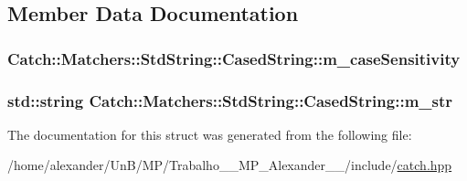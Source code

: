\subsection{Member Data Documentation}
\hypertarget{structCatch_1_1Matchers_1_1StdString_1_1CasedString_ae1c2864c986941536a6e94cca0528f92}{
\subsubsection[{m\-\_\-case\-Sensitivity}]{ Catch\-::\-Matchers\-::\-Std\-String\-::\-Cased\-String\-::m\-\_\-case\-Sensitivity}}\label{structCatch_1_1Matchers_1_1StdString_1_1CasedString_ae1c2864c986941536a6e94cca0528f92}
\hypertarget{structCatch_1_1Matchers_1_1StdString_1_1CasedString_ad05dbc99aba3c3c386d6b856b213f911}{
\subsubsection[{m\-\_\-str}]{\setlength{\rightskip}{0pt plus 5cm}std\-::string Catch\-::\-Matchers\-::\-Std\-String\-::\-Cased\-String\-::m\-\_\-str}}\label{structCatch_1_1Matchers_1_1StdString_1_1CasedString_ad05dbc99aba3c3c386d6b856b213f911}


The documentation for this struct was generated from the following file\-:\begin{DoxyCompactItemize}
\item 
/home/alexander/\-Un\-B/\-M\-P/\-Trabalho\-\_\-\_\-\-M\-P\-\_\-\-Alexander\-\_\-\_/include/\hyperlink{catch_8hpp}{catch.\-hpp}\end{DoxyCompactItemize}
